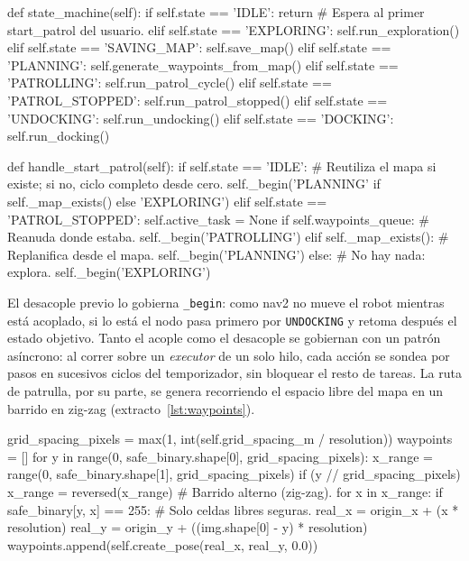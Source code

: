 %
\begin{pythoncode}[title={Máquina de estados y arranque (patrol\_nav.py)}, label={lst:fsm}]
def state_machine(self):
    if self.state == 'IDLE':
        return  # Espera al primer start_patrol del usuario.
    elif self.state == 'EXPLORING':      self.run_exploration()
    elif self.state == 'SAVING_MAP':     self.save_map()
    elif self.state == 'PLANNING':       self.generate_waypoints_from_map()
    elif self.state == 'PATROLLING':     self.run_patrol_cycle()
    elif self.state == 'PATROL_STOPPED': self.run_patrol_stopped()
    elif self.state == 'UNDOCKING':      self.run_undocking()
    elif self.state == 'DOCKING':        self.run_docking()

def handle_start_patrol(self):
    if self.state == 'IDLE':
        # Reutiliza el mapa si existe; si no, ciclo completo desde cero.
        self._begin('PLANNING' if self._map_exists() else 'EXPLORING')
    elif self.state == 'PATROL_STOPPED':
        self.active_task = None
        if self.waypoints_queue:        # Reanuda donde estaba.
            self._begin('PATROLLING')
        elif self._map_exists():        # Replanifica desde el mapa.
            self._begin('PLANNING')
        else:                           # No hay nada: explora.
            self._begin('EXPLORING')
\end{pythoncode}%

El desacople previo lo gobierna \texttt{\_begin}: como \gls{nav2} no mueve el robot
mientras está acoplado, si lo está el nodo pasa primero por \texttt{UNDOCKING} y
retoma después el estado objetivo. Tanto el acople como el desacople se gobiernan con
un patrón asíncrono: al correr sobre un \textit{executor} de un solo hilo, cada acción
se sondea por pasos en sucesivos ciclos del temporizador, sin bloquear el resto de
tareas. La ruta de patrulla, por su parte, se genera recorriendo el espacio libre del
mapa en un barrido en zig-zag (extracto~\ref{lst:waypoints}).

%
\begin{pythoncode}[title={Generación de waypoints en zig-zag (patrol\_nav.py)}, label={lst:waypoints}]
grid_spacing_pixels = max(1, int(self.grid_spacing_m / resolution))
waypoints = []
for y in range(0, safe_binary.shape[0], grid_spacing_pixels):
    x_range = range(0, safe_binary.shape[1], grid_spacing_pixels)
    if (y // grid_spacing_pixels) %
        x_range = reversed(x_range)        # Barrido alterno (zig-zag).
    for x in x_range:
        if safe_binary[y, x] == 255:       # Solo celdas libres seguras.
            real_x = origin_x + (x * resolution)
            real_y = origin_y + ((img.shape[0] - y) * resolution)
            waypoints.append(self.create_pose(real_x, real_y, 0.0))
\end{pythoncode}%

